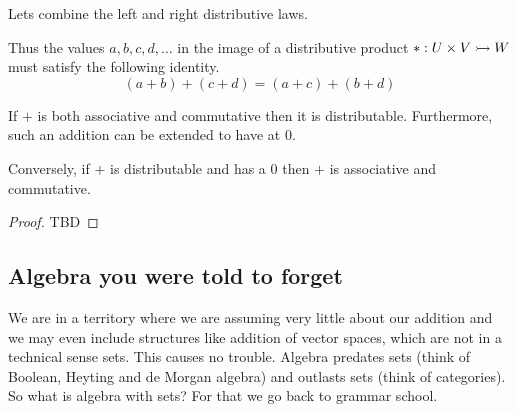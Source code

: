 Lets combine the left and right 
distributive laws.

\begin{center}
\end{center}
Thus the values $a,b,c,d,\ldots $ in the image of a distributive product $*:U\times V\rightarrowtail W$ must 
satisfy the following identity.
\begin{equation}
    \tag{Distributable}
    (a+b)+(c+d) = (a+c)+(b+d)
\end{equation}

\begin{proposition}
    If $+$ is both associative and commutative then it is distributable.
    Furthermore, such an addition can be extended to have at $0$.

    Conversely, if $+$ is distributable and has a $0$ then $+$ is associative 
    and commutative.
\end{proposition}
\begin{proof}
    TBD
\end{proof}

\subsection{Algebra you were told to forget}
We are in a territory where we are assuming very little about our addition 
and we may even include structures like addition of vector spaces, which are 
not in a technical sense sets.  This causes no trouble.  Algebra predates sets 
(think of Boolean, Heyting and de Morgan algebra) and outlasts sets (think 
of categories).  So what is algebra with sets?  For that we go back to grammar school.

